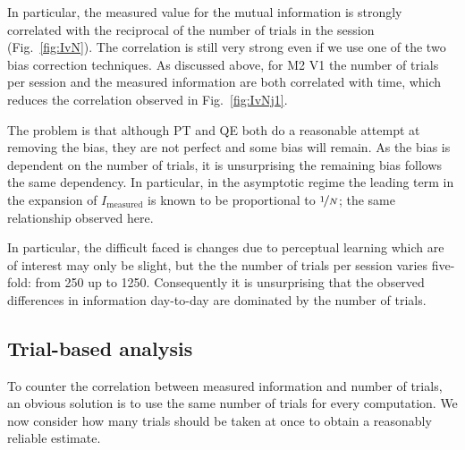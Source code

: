 In particular, the measured value for the mutual information is strongly correlated with the reciprocal of the number of trials in the session (Fig.~\ref{fig:IvN}). The correlation is still very strong even if we use one of the two bias correction techniques. As discussed above, for \ac{M2} \ac{V1} the number of trials per session and the measured information  are both correlated with time, which reduces the correlation observed in Fig.~\ref{fig:IvNj1}.

The problem is that although \ac{PT} and \ac{QE} both do a reasonable attempt at removing the bias, they are not perfect and some bias will remain. As the bias is dependent on the number of trials, it is unsurprising the remaining bias follows the same dependency.
In particular, in the asymptotic regime the leading term in the expansion of $I_{\text{measured}}$ is known to be proportional \cite{Treves1995} to $\nicefrac{1}{N}$; the same relationship observed here.

In particular, the difficult faced is changes due to perceptual learning which are of interest may only be slight, but the the number of trials per session varies five-fold: from 250 up to 1250. Consequently it is unsurprising that the observed differences in information day-to-day are dominated by the number of trials.

% 

\FloatBarrier
\subsection{Trial-based analysis}

To counter the correlation between measured information and number of trials, an obvious solution is to use the same number of trials for every computation. We now consider how many trials should be taken at once to obtain a reasonably reliable estimate.

